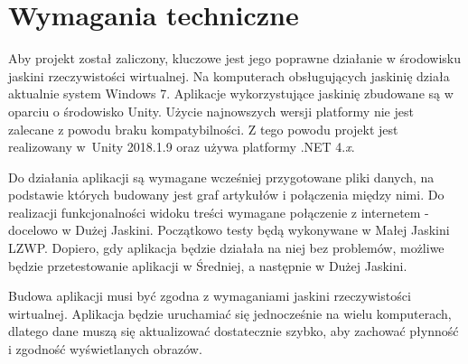 \section{Wymagania techniczne}
Aby projekt został zaliczony, kluczowe jest jego poprawne działanie w środowisku jaskini rzeczywistości wirtualnej. Na komputerach obsługujących jaskinię działa aktualnie system Windows 7. Aplikacje wykorzystujące jaskinię zbudowane są w oparciu o środowisko Unity. Użycie najnowszych wersji platformy nie jest zalecane z powodu braku kompatybilności. Z tego powodu projekt jest realizowany w~Unity 2018.1.9 oraz używa platformy .NET 4.\textit{x}.

Do działania aplikacji są wymagane wcześniej przygotowane pliki danych, na podstawie których budowany jest graf artykułów i połączenia między nimi. Do realizacji funkcjonalności widoku treści wymagane połączenie z internetem - docelowo w Dużej Jaskini. Początkowo testy będą wykonywane w Małej Jaskini LZWP. Dopiero, gdy aplikacja będzie działała na niej bez problemów, możliwe będzie przetestowanie aplikacji w Średniej, a następnie w Dużej Jaskini.

Budowa aplikacji musi być zgodna z wymaganiami jaskini rzeczywistości wirtualnej. Aplikacja będzie uruchamiać się jednocześnie na wielu komputerach, dlatego dane muszą się aktualizować dostatecznie szybko, aby zachować płynność i zgodność wyświetlanych obrazów.
\newpage
